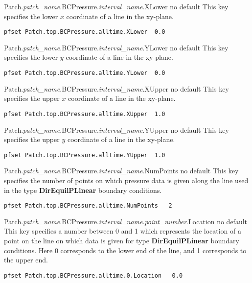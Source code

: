 {Patch.{\em patch\_name}.BCPressure.{\em interval\_name}.XLower}
{no default}
{This key specifies the lower $x$ coordinate of a line in the xy-plane.
}
\begin{display}\begin{verbatim}
pfset Patch.top.BCPressure.alltime.XLower  0.0
\end{verbatim}\end{display}

{Patch.{\em patch\_name}.BCPressure.{\em interval\_name}.YLower}
{no default}
{This key specifies the lower $y$ coordinate of a line in the xy-plane.
}
\begin{display}\begin{verbatim}
pfset Patch.top.BCPressure.alltime.YLower  0.0
\end{verbatim}\end{display}

{Patch.{\em patch\_name}.BCPressure.{\em interval\_name}.XUpper}
{no default}
{This key specifies the upper $x$ coordinate of a line in the xy-plane.
}
\begin{display}\begin{verbatim}
pfset Patch.top.BCPressure.alltime.XUpper  1.0
\end{verbatim}\end{display}

{Patch.{\em patch\_name}.BCPressure.{\em interval\_name}.YUpper}
{no default}
{This key specifies the upper $y$ coordinate of a line in the xy-plane.
}
\begin{display}\begin{verbatim}
pfset Patch.top.BCPressure.alltime.YUpper  1.0
\end{verbatim}\end{display}

{Patch.{\em patch\_name}.BCPressure.{\em interval\_name}.NumPoints}
{no default}
{This key specifies the number of points on which pressure data is given along
the line used in the type {\bf DirEquilPLinear} boundary conditions.
}
\begin{display}\begin{verbatim}
pfset Patch.top.BCPressure.alltime.NumPoints   2
\end{verbatim}\end{display}

{Patch.{\em patch\_name}.BCPressure.{\em interval\_name}.{\em point\_number}.Location}
{no default}
{This key specifies a number between 0 and 1 which represents
the location of a point on the line on which data is given for 
type {\bf DirEquilPLinear} boundary conditions.
Here 0 corresponds to the lower end of the line, and 1 corresponds to
the upper end.
}
\begin{display}\begin{verbatim}
pfset Patch.top.BCPressure.alltime.0.Location   0.0
\end{verbatim}\end{display}


